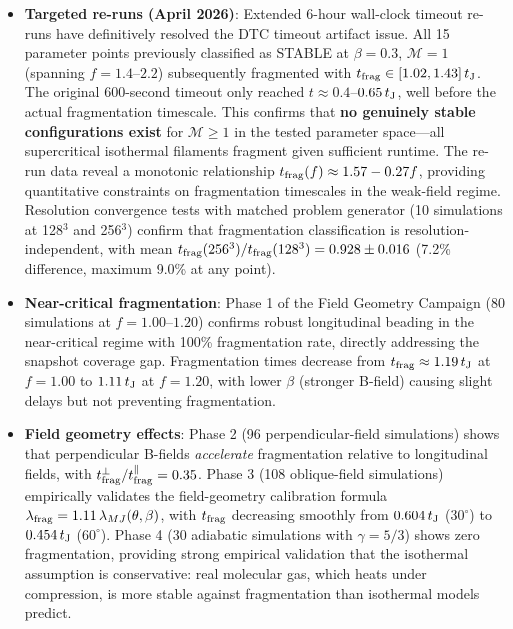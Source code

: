 \documentclass[twoside,twocolumn]{mnras}
\begin{document}
\begin{itemize}
    \item \textbf{Targeted re-runs (April 2026)}: Extended 6-hour wall-clock timeout re-runs have definitively resolved the DTC timeout artifact issue. All 15 parameter points previously classified as STABLE at $\beta = 0.3$, $\mathcal{M} = 1$ (spanning $f = 1.4$--$2.2$) subsequently fragmented with $t_{\rm frag} \in [1.02, 1.43]\,t_{\rm J}$. The original 600-second timeout only reached $t \approx 0.4$--$0.65\,t_{\rm J}$, well before the actual fragmentation timescale. This confirms that \textbf{no genuinely stable configurations exist} for $\mathcal{M} \geq 1$ in the tested parameter space—all supercritical isothermal filaments fragment given sufficient runtime. The re-run data reveal a monotonic relationship $t_{\rm frag}(f) \approx 1.57 - 0.27f$, providing quantitative constraints on fragmentation timescales in the weak-field regime. Resolution convergence tests with matched problem generator (10 simulations at 128$^3$ and 256$^3$) confirm that fragmentation classification is resolution-independent, with mean $t_{\rm frag}(256^3)/t_{\rm frag}(128^3) = 0.928 \pm 0.016$ (7.2\% difference, maximum 9.0\% at any point).

    \item \textbf{Near-critical fragmentation}: Phase 1 of the Field Geometry Campaign (80 simulations at $f = 1.00$--$1.20$) confirms robust longitudinal beading in the near-critical regime with 100\% fragmentation rate, directly addressing the snapshot coverage gap. Fragmentation times decrease from $t_{\rm frag} \approx 1.19\,t_{\rm J}$ at $f = 1.00$ to $1.11\,t_{\rm J}$ at $f = 1.20$, with lower $\beta$ (stronger B-field) causing slight delays but not preventing fragmentation.

    \item \textbf{Field geometry effects}: Phase 2 (96 perpendicular-field simulations) shows that perpendicular B-fields {\it accelerate} fragmentation relative to longitudinal fields, with $t_{\rm frag}^{\perp} / t_{\rm frag}^{\parallel} = 0.35$. Phase 3 (108 oblique-field simulations) empirically validates the field-geometry calibration formula $\lambda_{\rm frag} = 1.11\,\lambda_{MJ}(\theta, \beta)$, with $t_{\rm frag}$ decreasing smoothly from $0.604\,t_{\rm J}$ ($30^\circ$) to $0.454\,t_{\rm J}$ ($60^\circ$). Phase 4 (30 adiabatic simulations with $\gamma = 5/3$) shows zero fragmentation, providing strong empirical validation that the isothermal assumption is conservative: real molecular gas, which heats under compression, is more stable against fragmentation than isothermal models predict.


\end{itemize}
\end{document}
